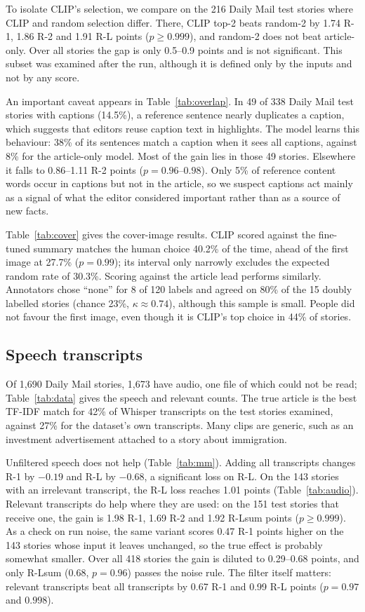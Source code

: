 \documentclass[conference]{IEEEtran}
\begin{document}
To isolate CLIP's selection, we compare on the 216 Daily Mail test stories where CLIP and random selection differ. There, CLIP top-2 beats random-2 by 1.74 R-1, 1.86 R-2 and 1.91 R-L points ($p\ge0.999$), and random-2 does not beat article-only. Over all stories the gap is only 0.5--0.9 points and is not significant. This subset was examined after the run, although it is defined only by the inputs and not by any score.

An important caveat appears in Table~\ref{tab:overlap}. In 49 of 338 Daily Mail test stories with captions (14.5\%), a reference sentence nearly duplicates a caption, which suggests that editors reuse caption text in highlights. The model learns this behaviour: 38\% of its sentences match a caption when it sees all captions, against 8\% for the article-only model. Most of the gain lies in those 49 stories. Elsewhere it falls to 0.86--1.11 R-2 points ($p=0.96$--$0.98$). Only 5\% of reference content words occur in captions but not in the article, so we suspect captions act mainly as a signal of what the editor considered important rather than as a source of new facts.

Table~\ref{tab:cover} gives the cover-image results. CLIP scored against the fine-tuned summary matches the human choice 40.2\% of the time, ahead of the first image at 27.7\% ($p=0.99$); its interval only narrowly excludes the expected random rate of 30.3\%. Scoring against the article lead performs similarly. Annotators chose ``none'' for 8 of 120 labels and agreed on 80\% of the 15 doubly labelled stories (chance 23\%, $\kappa\approx0.74$), although this sample is small. People did not favour the first image, even though it is CLIP's top choice in 44\% of stories.

\subsection{Speech transcripts}
Of 1{,}690 Daily Mail stories, 1{,}673 have audio, one file of which could not be read; Table~\ref{tab:data} gives the speech and relevant counts. The true article is the best TF-IDF match for 42\% of Whisper transcripts on the test stories examined, against 27\% for the dataset's own transcripts. Many clips are generic, such as an investment advertisement attached to a story about immigration.

Unfiltered speech does not help (Table~\ref{tab:mm}). Adding all transcripts changes R-1 by $-0.19$ and R-L by $-0.68$, a significant loss on R-L. On the 143 stories with an irrelevant transcript, the R-L loss reaches 1.01 points (Table~\ref{tab:audio}). Relevant transcripts do help where they are used: on the 151 test stories that receive one, the gain is 1.98 R-1, 1.69 R-2 and 1.92 R-Lsum points ($p\ge0.999$). As a check on run noise, the same variant scores 0.47 R-1 points higher on the 143 stories whose input it leaves unchanged, so the true effect is probably somewhat smaller. Over all 418 stories the gain is diluted to 0.29--0.68 points, and only R-Lsum (0.68, $p=0.96$) passes the noise rule. The filter itself matters: relevant transcripts beat all transcripts by 0.67 R-1 and 0.99 R-L points ($p=0.97$ and $0.998$).
\end{document}
